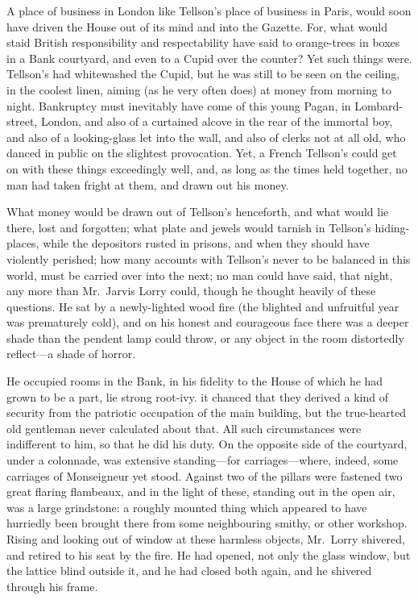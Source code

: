 A place of business in London like Tellson's place of business in
Paris, would soon have driven the House out of its mind and into the
Gazette. For, what would staid British responsibility and
respectability have said to orange-trees in boxes in a Bank courtyard,
and even to a Cupid over the counter?  Yet such things were.
Tellson's had whitewashed the Cupid, but he was still to be seen on
the ceiling, in the coolest linen, aiming (as he very often does) at
money from morning to night.  Bankruptcy must inevitably have come of
this young Pagan, in Lombard-street, London, and also of a curtained
alcove in the rear of the immortal boy, and also of a looking-glass
let into the wall, and also of clerks not at all old, who danced in
public on the slightest provocation.  Yet, a French Tellson's could
get on with these things exceedingly well, and, as long as the times
held together, no man had taken fright at them, and drawn out his money.

What money would be drawn out of Tellson's henceforth, and what would
lie there, lost and forgotten; what plate and jewels would tarnish in
Tellson's hiding-places, while the depositors rusted in prisons, and
when they should have violently perished; how many accounts with
Tellson's never to be balanced in this world, must be carried over
into the next; no man could have said, that night, any more than
Mr.\ Jarvis Lorry could, though he thought heavily of these questions.
He sat by a newly-lighted wood fire (the blighted and unfruitful year
was prematurely cold), and on his honest and courageous face there
was a deeper shade than the pendent lamp could throw, or any object
in the room distortedly reflect---a shade of horror.

He occupied rooms in the Bank, in his fidelity to the House of which
he had grown to be a part, lie strong root-ivy. it chanced that they
derived a kind of security from the patriotic occupation of the main
building, but the true-hearted old gentleman never calculated about
that.  All such circumstances were indifferent to him, so that he did
his duty.  On the opposite side of the courtyard, under a colonnade,
was extensive standing---for carriages---where, indeed, some carriages
of Monseigneur yet stood.  Against two of the pillars were fastened
two great flaring flambeaux, and in the light of these, standing out
in the open air, was a large grindstone:  a roughly mounted thing
which appeared to have hurriedly been brought there from some
neighbouring smithy, or other workshop.  Rising and looking out of
window at these harmless objects, Mr.\ Lorry shivered, and retired to
his seat by the fire.  He had opened, not only the glass window, but
the lattice blind outside it, and he had closed both again, and he
shivered through his frame.

